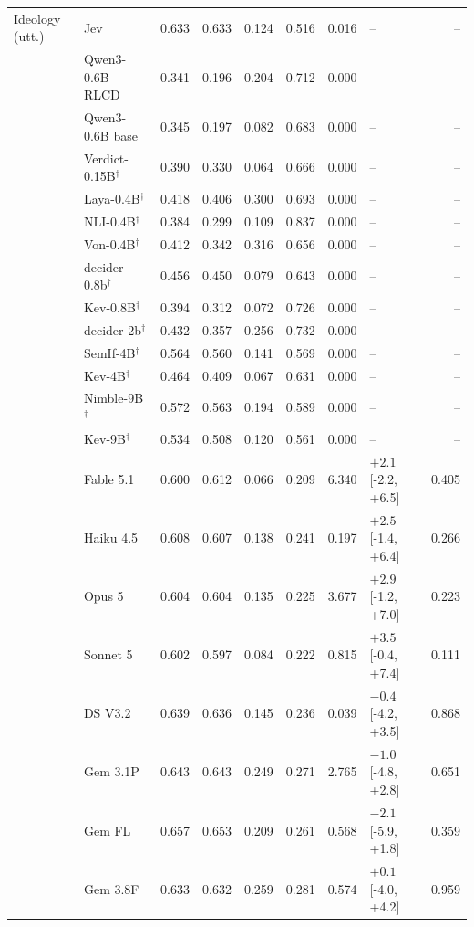 \begin{longtable}{llrrrrrlr}
\midrule
Ideology (utt.) & Jev & 0.633 & 0.633 & 0.124 & 0.516 & 0.016 & -- & -- \\
 & Qwen3-0.6B-RLCD & 0.341 & 0.196 & 0.204 & 0.712 & 0.000 & -- & -- \\
 & Qwen3-0.6B base & 0.345 & 0.197 & 0.082 & 0.683 & 0.000 & -- & -- \\
 & Verdict-0.15B$^{\dagger}$ & 0.390 & 0.330 & 0.064 & 0.666 & 0.000 & -- & -- \\
 & Laya-0.4B$^{\dagger}$ & 0.418 & 0.406 & 0.300 & 0.693 & 0.000 & -- & -- \\
 & NLI-0.4B$^{\dagger}$ & 0.384 & 0.299 & 0.109 & 0.837 & 0.000 & -- & -- \\
 & Von-0.4B$^{\dagger}$ & 0.412 & 0.342 & 0.316 & 0.656 & 0.000 & -- & -- \\
 & decider-0.8b$^{\dagger}$ & 0.456 & 0.450 & 0.079 & 0.643 & 0.000 & -- & -- \\
 & Kev-0.8B$^{\dagger}$ & 0.394 & 0.312 & 0.072 & 0.726 & 0.000 & -- & -- \\
 & decider-2b$^{\dagger}$ & 0.432 & 0.357 & 0.256 & 0.732 & 0.000 & -- & -- \\
 & SemIf-4B$^{\dagger}$ & 0.564 & 0.560 & 0.141 & 0.569 & 0.000 & -- & -- \\
 & Kev-4B$^{\dagger}$ & 0.464 & 0.409 & 0.067 & 0.631 & 0.000 & -- & -- \\
 & Nimble-9B$^{\dagger}$ & 0.572 & 0.563 & 0.194 & 0.589 & 0.000 & -- & -- \\
 & Kev-9B$^{\dagger}$ & 0.534 & 0.508 & 0.120 & 0.561 & 0.000 & -- & -- \\
 & Fable 5.1 & 0.600 & 0.612 & 0.066 & 0.209 & 6.340 & $+2.1$ [-2.2, +6.5] & 0.405 \\
 & Haiku 4.5 & 0.608 & 0.607 & 0.138 & 0.241 & 0.197 & $+2.5$ [-1.4, +6.4] & 0.266 \\
 & Opus 5 & 0.604 & 0.604 & 0.135 & 0.225 & 3.677 & $+2.9$ [-1.2, +7.0] & 0.223 \\
 & Sonnet 5 & 0.602 & 0.597 & 0.084 & 0.222 & 0.815 & $+3.5$ [-0.4, +7.4] & 0.111 \\
 & DS V3.2 & 0.639 & 0.636 & 0.145 & 0.236 & 0.039 & $-0.4$ [-4.2, +3.5] & 0.868 \\
 & Gem 3.1P & 0.643 & 0.643 & 0.249 & 0.271 & 2.765 & $-1.0$ [-4.8, +2.8] & 0.651 \\
 & Gem FL & 0.657 & 0.653 & 0.209 & 0.261 & 0.568 & $-2.1$ [-5.9, +1.8] & 0.359 \\
 & Gem 3.8F & 0.633 & 0.632 & 0.259 & 0.281 & 0.574 & $+0.1$ [-4.0, +4.2] & 0.959 \\

\end{longtable}
